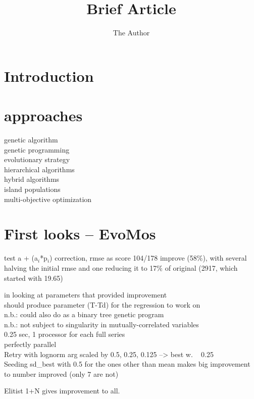 \documentclass[11pt, oneside]{article}   	%
\title{Brief Article}
\author{The Author}
\begin{document}
\maketitle

\section{Introduction}

\section{approaches}
genetic algorithm\\
genetic programming\\
evolutionary strategy\\

hierarchical algorithms\\
hybrid algorithms\\
island populations\\

multi-objective optimization\\


\section{First looks -- EvoMos}
test a + \Sigma(a$_i$*p$_i$) correction, rmse as score
104/178 improve (58\%), with several halving the initial rmse and one reducing it to 17\% of original (2917, which started with 19.65)

in looking at parameters that provided improvement\\ 

should produce parameter (T-Td) for the regression to work on\\
n.b.: could also do as a binary tree genetic program\\
n.b.: not subject to singularity in mutually-correlated variables\\
0.25 sec, 1 processor for each full series\\
perfectly parallel\\

Retry with lognorm arg scaled by 0.5, 0.25, 0.125 --> best w. ~ 0.25\\

Seeding sd_best with 0.5 for the ones other than mean makes big improvement to number improved (only 7 are not)

Elitist 1+N gives improvement to all.



\end{document}
